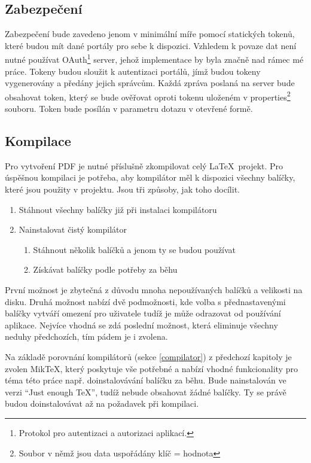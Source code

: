 \subsection{Zabezpečení}
Zabezpečení bude zavedeno jenom v minimální míře pomocí statických tokenů, které budou mít dané portály pro sebe k dispozici. Vzhledem k povaze dat není nutné používat OAuth\footnote{Protokol pro autentizaci a autorizaci aplikací.} server, jehož implementace by byla značně nad rámec mé práce. Tokeny budou sloužit k autentizaci portálů, jímž budou tokeny vygenerovány a předány jejich správcům. Každá zpráva poslaná na server bude obsahovat token, který se bude ověřovat oproti tokenu uloženém v properties\footnote{Soubor v němž jsou data uspořádány klíč = hodnota} souboru. Token bude posílán v parametru dotazu v otevřené formě. 

\subsection{Kompilace}
Pro vytvoření PDF je nutné příslušně zkompilovat celý \LaTeX\ projekt. Pro úspěšnou kompilaci je potřeba, aby kompilátor měl k dispozici všechny balíčky, které jsou použity v projektu. Jsou tři způsoby, jak toho docílit.
\begin{enumerate}
	\item Stáhnout všechny balíčky již při instalaci kompilátoru
	\item Nainstalovat čistý kompilátor
		\begin{enumerate}
			\item Stáhnout několik balíčků a jenom ty se budou používat
			\item Získávat balíčky podle potřeby za běhu
		\end{enumerate}
\end{enumerate}
První možnost je zbytečná z důvodu mnoha nepoužívaných balíčků a velikosti na disku. Druhá možnost nabízí dvě podmožnosti, kde volba s přednastavenými balíčky vytváří omezení pro uživatele tudíž je může odrazovat od používání aplikace. Nejvíce vhodná se zdá poslední možnost, která eliminuje všechny neduhy předchozích, tím pádem je i zvolena.
\par
Na základě porovnání kompilátorů (sekce \ref{compilator}) z předchozí kapitoly je zvolen MikTeX, který poskytuje vše potřebné a nabízí vhodné funkcionality pro téma této práce např. doinstalovávání balíčku za běhu. Bude nainstalován ve verzi \enquote{Just enough TeX}, tudíž nebude obsahovat žádné balíčky. Ty se právě budou doinstalovávat až na požadavek při kompilaci.

